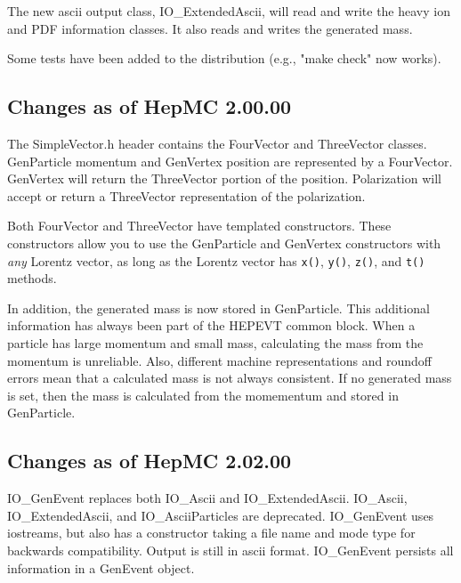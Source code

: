 \documentclass[11pt,letterpaper]{article}
\begin{document}
The new ascii output class, IO\_ExtendedAscii, will read and write the heavy 
ion and PDF information classes.  It also reads and writes the generated mass.

Some tests have been added to the distribution (e.g., "make check" now works).

%
%

\subsection{Changes as of HepMC 2.00.00}

The SimpleVector.h header contains the FourVector and ThreeVector classes.
GenParticle momentum and GenVertex position are represented by a FourVector. 
GenVertex will return the ThreeVector portion of the position.
Polarization will accept or return a ThreeVector representation 
of the polarization.

Both FourVector and ThreeVector have templated constructors.  
These constructors allow you to use the GenParticle and GenVertex constructors
with \emph{any} Lorentz vector, as long as the Lorentz vector has 
\verb!x()!, \verb!y()!, \verb!z()!, and \verb!t()! methods.

In addition, the generated mass is now stored in GenParticle.  
This additional information has always been part of the HEPEVT common block.
When a particle has large momentum and small mass, 
calculating the mass from the momentum is unreliable.
Also, different machine representations and roundoff errors mean that
a calculated mass is not always consistent.
If no generated mass is set, then the mass is calculated from the momementum 
and stored in GenParticle.

%
%

\subsection{Changes as of HepMC 2.02.00}

IO\_GenEvent replaces both IO\_Ascii and IO\_ExtendedAscii.
IO\_Ascii, IO\_ExtendedAscii, and IO\_AsciiParticles are deprecated.
IO\_GenEvent uses iostreams, but also has a constructor taking a file
name and mode type for backwards compatibility. 
Output is still in ascii format.
IO\_GenEvent persists all information in a GenEvent object.

%
%
\end{document}
